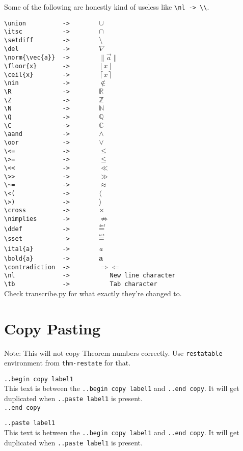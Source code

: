 \documentclass[12pt]{article}
\newcommand{\union}{\cup }
\newcommand{\itsc}{\cap }
\newcommand{\setdiff}{\setminus }
\newcommand{\del}{\nabla }
\newcommand{\Q}{\mathbb{Q}}
\newcommand{\R}{\mathbb{R} }
\newcommand{\Z}{\mathbb{Z} }
\newcommand{\N}{\mathbb{N} }
\newcommand{\C}{\mathbb{C} }
\newcommand{\nin}{\notin }
\newcommand{\ital}{\emph }
\newcommand{\contradiction}{$\Rightarrow\Leftarrow$}
\newcommand{\aand}{\wedge }
\newcommand{\oor}{\vee }
\newcommand{\cross}{\times }
\newcommand{\nimplies}{\nRightarrow}
\newcommand{\nl}{\\}
\newcommand{\tb}{\quad}
\newcommand{\norm}[1]{\|#1\|}
\newcommand{\ddef}{\mathrel{\stackrel{\makebox[0pt]{\mbox{\normalfont\tiny def}}}{=}}}
\newcommand{\sset}{\mathrel{\stackrel{\makebox[0pt]{\mbox{\normalfont\tiny set}}}{=}}}
\newcommand{\floor}[1]{\left\lfloor #1 \right\rfloor}
\newcommand{\ceil}[1]{\left\lceil #1 \right\rceil}
\renewcommand\bold{\textbf}
\numberwithin{equation}{section}
\begin{document}
\medskip

Some of the following are honestly kind of useless like \verb|\nl -> \\|.

\verb|\union          ->        |$\union$\nl
\verb|\itsc           ->        |$\itsc$\nl
\verb|\setdiff        ->        |$\setdiff$\nl
\verb|\del            ->        |$\del$\nl
\verb|\norm{\vec{a}}  ->        |$\norm{\vec{a}}$\nl
\verb|\floor{x}       ->        |$\floor{x}$\nl
\verb|\ceil{x}        ->        |$\ceil{x}$\nl
\verb|\nin            ->        |$\nin$\nl
\verb|\R              ->        |$\R$\nl
\verb|\Z              ->        |$\Z$\nl
\verb|\N              ->        |$\N$\nl
\verb|\Q              ->        |$\Q$\nl
\verb|\C              ->        |$\C$\nl
\verb|\aand           ->        |$\aand$\nl
\verb|\oor            ->        |$\oor$\nl
\verb|\<=             ->        |$\leq $\nl
\verb|\>=             ->        |$\leq $\nl
\verb|\<<             ->        |$\ll $\nl
\verb|\>>             ->        |$\gg $\nl
\verb|\~=             ->        |$\approx $\nl
\verb|\<(             ->        |$\langle $\nl
\verb|\>)             ->        |$\rangle $\nl
\verb|\cross          ->        |$\cross$\nl
\verb|\nimplies       ->        |$\nimplies$\nl
\verb|\ddef           ->        |$\ddef$\nl
\verb|\sset           ->        |$\sset$\nl
\bigskip
\verb|\ital{a}        ->        |\ital{a}\nl
\verb|\bold{a}        ->        |\bold{a}\nl
\verb|\contradiction  ->        |\contradiction \nl
\verb|\nl             ->           New line character|\nl
\verb|\tb             ->           Tab character|\nl
\bigskip
Check transcribe.py for what exactly they're changed to.

\newpage

\section{Copy Pasting}
Note: This will not copy Theorem numbers correctly. Use \verb|restatable| environment from \verb|thm-restate| for that.

\bigskip

\verb|..begin copy label1| \nl
This text is between the \verb|..begin copy label1| and \verb|..end copy|. It will get duplicated when \verb|..paste label1| is present. \nl
\verb|..end copy|

\bigskip

\verb|..paste label1| \nl
This text is between the \verb|..begin copy label1| and \verb|..end copy|. It will get duplicated when \verb|..paste label1| is present. \nl
\end{document}
